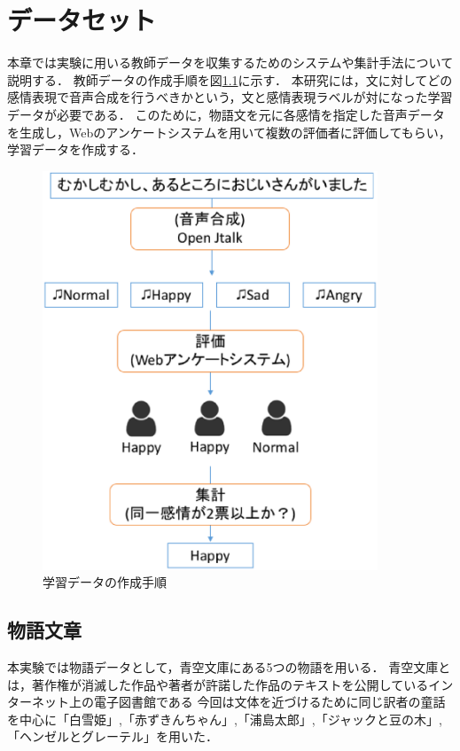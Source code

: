 \chapter{データセット}
本章では実験に用いる教師データを収集するためのシステムや集計手法について説明する．
教師データの作成手順を図\ref{fig:enquete}に示す．
本研究には，文に対してどの感情表現で音声合成を行うべきかという，文と感情表現ラベルが対になった学習データが必要である．
このために，物語文を元に各感情を指定した音声データを生成し，Webのアンケートシステムを用いて複数の評価者に評価してもらい，学習データを作成する．

\begin{figure}[hb]
  \begin{center}
    \includegraphics[clip,width=10.0cm]{fig/enquete.eps}
    \caption{学習データの作成手順}
    \label{fig:enquete}
  \end{center}
\end{figure}

\section{物語文章}
本実験では物語データとして，青空文庫\cite{aozora}にある5つの物語を用いる．
青空文庫とは，著作権が消滅した作品や著者が許諾した作品のテキストを公開しているインターネット上の電子図書館である
今回は文体を近づけるために同じ訳者の童話を中心に「白雪姫」,「赤ずきんちゃん」,「浦島太郎」,「ジャックと豆の木」,「ヘンゼルとグレーテル」を用いた．

